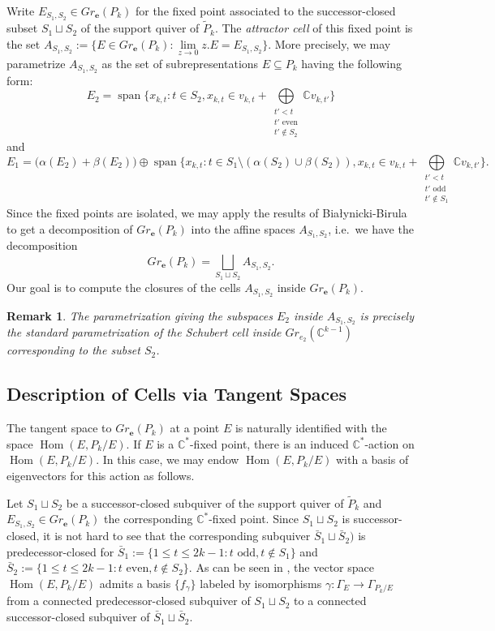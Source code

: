 \documentclass{amsart}
\newtheorem{remark}[theorem]{Remark}
\numberwithin{equation}{section}
\newcommand{\CC}{\mathbb{C}}
\newcommand{\Hom}{\operatorname{Hom}}
\newcommand{\Span}{\operatorname{span}}
\newcommand{\bfe}{\mathbf{e}}
\begin{document}
  Write $E_{S_1,S_2}\in Gr_\bfe(P_k)$ for the fixed point associated to the successor-closed subset $S_1\sqcup S_2$ of the support quiver of $\widetilde P_k$.
  The \emph{attractor cell} of this fixed point is the set $A_{S_1,S_2}:=\{ E\in Gr_\bfe(P_k) : \lim\limits_{z\to 0} z.E=E_{S_1,S_2} \}$.
  More precisely, we may parametrize $A_{S_1,S_2}$ as the set of subrepresentations $E\subseteq P_k$ having the following form:
  \[ E_2 = \Span\{x_{k,t}:t\in S_2, x_{k,t}\in v_{k,t}+\bigoplus\limits_{\substack{t'<t\\ \text{$t'$ even}\\ t'\notin S_2}} \CC v_{k,t'} \} \]
  and
  \[ E_1 = \big(\alpha(E_2)+\beta(E_2)\big)\oplus\Span\{x_{k,t}:t\in S_1\setminus(\alpha(S_2)\cup\beta(S_2)), x_{k,t}\in v_{k,t}+\bigoplus\limits_{\substack{t'<t\\ \text{$t'$ odd}\\ t'\notin S_1}} \CC v_{k,t'} \}. \]
  Since the fixed points are isolated, we may apply the results of Bia\l{}ynicki-Birula to get a decomposition of $Gr_\bfe(P_k)$ into the affine spaces $A_{S_1,S_2}$, i.e.\ we have the decomposition 
  \[Gr_\bfe(P_k)=\bigsqcup_{S_1\sqcup S_2} A_{S_1,S_2}.\]
  Our goal is to compute the closures of the cells $A_{S_1,S_2}$ inside $Gr_\bfe(P_k)$.

  \begin{remark}
    The parametrization giving the subspaces $E_2$ inside $A_{S_1,S_2}$ is precisely the standard parametrization of the Schubert cell inside $Gr_{e_2}(\CC^{k-1})$ corresponding to the subset $S_2$.
  \end{remark}

  \subsection{Description of Cells via Tangent Spaces}
  \label{sec:tangent parametrization}
  The tangent space to $Gr_\bfe(P_k)$ at a point $E$ is naturally identified with the space $\Hom(E,P_k/E)$.
  If $E$ is a $\CC^*$-fixed point, there is an induced $\CC^*$-action on $\Hom(E,P_k/E)$.
  In this case, we may endow $\Hom(E,P_k/E)$ with a basis of eigenvectors for this action as follows.

  Let $S_1\sqcup S_2$ be a successor-closed subquiver of the support quiver of $\tilde P_k$ and $E_{S_1,S_2}\in Gr_\bfe(P_k)$ the corresponding $\CC^*$-fixed point.
  Since $S_1\sqcup S_2$ is successor-closed, it is not hard to see that the corresponding subquiver $\bar{S}_1\sqcup\bar{S}_2)$ is predecessor-closed for $\bar{S}_1:=\{1\le t\le 2k-1:\text{$t$ odd},t\notin S_1\}$ and $\bar{S}_2:=\{1\le t\le 2k-1:\text{$t$ even},t\notin S_2\}$.
  As can be seen in \cite[Prop. 2.0.2]{cerulli irelli-esposito}, the vector space $\Hom(E,P_k/E)$ admits a basis $\{f_\gamma\}$ labeled by isomorphisms $\gamma:\Gamma_E\to\Gamma_{P_k/E}$ from a connected predecessor-closed subquiver of $S_1\sqcup S_2$ to a connected successor-closed subquiver of $\bar{S}_1\sqcup\bar{S}_2$.
\end{document}
